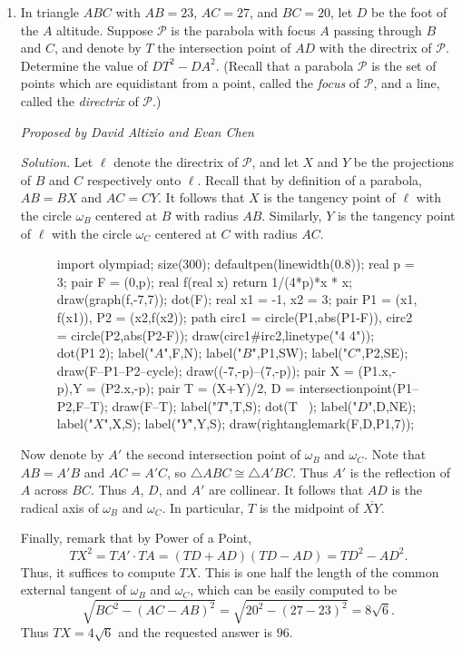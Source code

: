 \documentclass[10pt]{article}
\newcommand{\proposed}[1]
{
\vspace{5pt}
\noindent\textit{Proposed by #1}
}
\newcommand{\solution}
{
\vspace{5pt}
\noindent\textit{Solution.}\qquad
}
\begin{document}
\begin{enumerate}
\item In triangle $ABC$ with $AB=23$, $AC=27$, and $BC=20$, let $D$ be the foot of the $A$ altitude.  Suppose $\mathcal{P}$ is the parabola with focus $A$ passing through $B$ and $C$, and denote by $T$ the intersection point of $AD$ with the directrix of $\mathcal P$.  Determine the value of $DT^2-DA^2$.  (Recall that a parabola $\mathcal P$ is the set of points which are equidistant from a point, called the \textit{focus} of $\mathcal P$, and a line, called the \textit{directrix} of $\mathcal P$.)

\proposed{David Altizio and Evan Chen}

\solution Let $\ell$ denote the directrix of $\mathcal P$, and let $X$ and $Y$ be the projections of $B$ and $C$ respectively onto $\ell$.  Recall that by definition of a parabola, $AB=BX$ and $AC=CY$.  It follows that $X$ is the tangency point of $\ell$ with the circle $\omega_B$ centered at $B$ with radius $AB$.  Similarly, $Y$ is the tangency point of $\ell$ with the circle $\omega_C$ centered at $C$ with radius $AC$.

\begin{figure}[ht]
	\centering
	\begin{asy}
	import olympiad;
	size(300);
defaultpen(linewidth(0.8));
real p = 3;
pair F = (0,p);
real f(real x) { return 1/(4*p)*x * x;}
draw(graph(f,-7,7));
dot(F);
real x1 = -1, x2 = 3;
pair P1 = (x1, f(x1)), P2 = (x2,f(x2));
path circ1 = circle(P1,abs(P1-F)), circ2 = circle(P2,abs(P2-F));
draw(circ1^^circ2,linetype("4 4"));
dot(P1^^P2);
label("$A$",F,N);
label("$B$",P1,SW);
label("$C$",P2,SE);
draw(F--P1--P2--cycle);
draw((-7,-p)--(7,-p));
pair X = (P1.x,-p),Y = (P2.x,-p);
pair T = (X+Y)/2, D = intersectionpoint(P1--P2,F--T);
draw(F--T);
label("$T$",T,S);
dot(T^^D^^X^^Y);
label("$D$",D,NE);
label("$X$",X,S);
label("$Y$",Y,S);
draw(rightanglemark(F,D,P1,7));
\end{asy}
\end{figure}

\par Now denote by $A'$ the second intersection point of $\omega_B$ and $\omega_C$.  Note that $AB=A'B$ and $AC=A'C$, so $\triangle ABC\cong\triangle A'BC$.  Thus $A'$ is the reflection of $A$ across $BC$.  Thus $A$, $D$, and $A'$ are collinear.  It follows that $AD$ is the radical axis of $\omega_B$ and $\omega_C$.  In particular, $T$ is the midpoint of $\overline{XY}$.

\par Finally, remark that by Power of a Point, \[TX^2=TA'\cdot TA = (TD+AD)(TD-AD) = TD^2-AD^2.\]  Thus, it suffices to compute $TX$.  This is one half the length of the common external tangent of $\omega_B$ and $\omega_C$, which can be easily computed to be \[\sqrt{BC^2 - (AC-AB)^2} = \sqrt{20^2 - (27-23)^2} = 8\sqrt 6.\] Thus $TX=4\sqrt{6}$ and the requested answer is $\boxed{96}$.


\end{enumerate}
\end{document}
